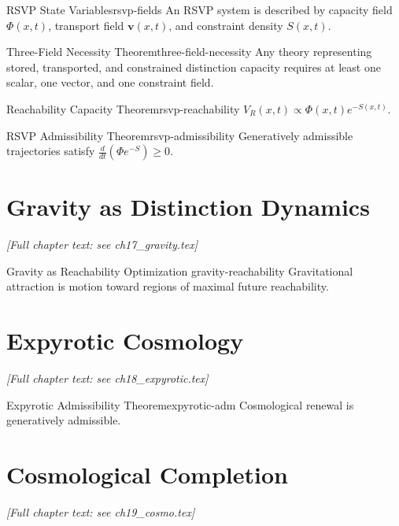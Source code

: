 \documentclass[12pt,twoside,openright]{book}
\begin{document}
\begin{definition}{RSVP State Variables}{rsvp-fields}
  An RSVP system is described by capacity field $\Phi(x,t)$,
  transport field $\mathbf{v}(x,t)$, and constraint density
  $S(x,t)$.
\end{definition}
\begin{theorem}{Three-Field Necessity Theorem}{three-field-necessity}
  Any theory representing stored, transported, and
  constrained distinction capacity requires at least one
  scalar, one vector, and one constraint field.
\end{theorem}
\begin{theorem}{Reachability Capacity Theorem}{rsvp-reachability}
  $V_R(x,t)\propto\Phi(x,t)e^{-S(x,t)}$.
\end{theorem}
\begin{theorem}{RSVP Admissibility Theorem}{rsvp-admissibility}
  Generatively admissible trajectories satisfy
  $\frac{d}{dt}(\Phi e^{-S})\ge0$.
\end{theorem}

\chapter{Gravity as Distinction Dynamics}
\label{ch:gravity}
\emph{[Full chapter text: see ch17\_gravity.tex]}

\begin{theorem}{Gravity as Reachability Optimization}%
  {gravity-reachability}
  Gravitational attraction is motion toward regions of
  maximal future reachability.
\end{theorem}

\chapter{Expyrotic Cosmology}
\label{ch:expyrotic}
\emph{[Full chapter text: see ch18\_expyrotic.tex]}

\begin{theorem}{Expyrotic Admissibility Theorem}{expyrotic-adm}
  Cosmological renewal is generatively admissible.
  \parencite{steinhardt2002,penrose2010}
\end{theorem}

\chapter{Cosmological Completion}
\label{ch:cosmo-completion}
\emph{[Full chapter text: see ch19\_cosmo.tex]}
\end{document}
